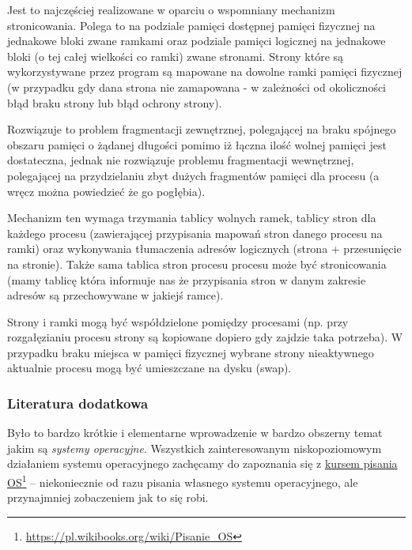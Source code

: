 Jest to najczęściej realizowane w oparciu o wspomniany mechanizm stronicowania. Polega to na podziale pamięci dostępnej pamięci fizycznej na jednakowe bloki zwane ramkami oraz podziale pamięci logicznej na jednakowe bloki (o tej całej wielkości co ramki) zwane stronami. Strony które są wykorzystywane przez program są mapowane na dowolne ramki pamięci fizycznej (w przypadku gdy dana strona nie zamapowana - w zależności od okoliczności błąd braku strony lub błąd ochrony strony).

Rozwiązuje to problem fragmentacji zewnętrznej, polegającej na braku spójnego obszaru pamięci o żądanej długości pomimo iż łączna ilość wolnej pamięci jest dostateczna, jednak nie rozwiązuje problemu fragmentacji wewnętrznej, polegającej na przydzielaniu zbyt dużych fragmentów pamięci dla procesu (a wręcz można powiedzieć że go pogłębia).

Mechanizm ten wymaga trzymania tablicy wolnych ramek, tablicy stron dla każdego procesu (zawierającej przypisania mapowań stron danego procesu na ramki) oraz wykonywania tłumaczenia adresów logicznych (strona + przesunięcie na stronie). Także sama tablica stron procesu procesu może być stronicowania (mamy tablicę która informuje nas że przypisania stron w danym zakresie adresów są przechowywane w jakiejś ramce).

Strony i ramki mogą być współdzielone pomiędzy procesami (np. przy rozgałęzianiu procesu strony są kopiowane dopiero gdy zajdzie taka potrzeba). W przypadku braku miejsca w pamięci fizycznej wybrane strony nieaktywnego aktualnie procesu mogą być umieszczane na dysku (swap).

\subsubsection{Literatura dodatkowa \zaawansowane{***}}

Było to bardzo krótkie i elementarne wprowadzenie w bardzo obszerny temat jakim są \textit{systemy operacyjne}. Wszystkich zainteresowanym niskopoziomowym działaniem systemu operacyjnego zachęcamy do zapoznania się z \href{https://pl.wikibooks.org/wiki/Pisanie_OS}{kursem pisania OS}\footnote{\url{https://pl.wikibooks.org/wiki/Pisanie_OS}} – niekoniecznie od razu pisania własnego systemu operacyjnego, ale przynajmniej zobaczeniem jak to się robi.
